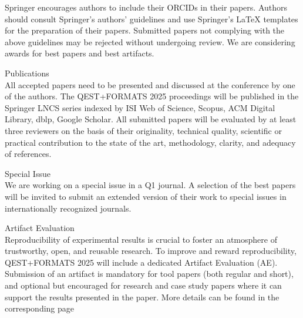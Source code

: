 Springer encourages authors to include their ORCIDs in their papers. Authors should consult Springer’s authors’ guidelines and use Springer’s LaTeX templates for the preparation of their papers. Submitted papers not complying with the above guidelines may be rejected without undergoing review.
We are considering awards for best papers and best artifacts.

Publications\\
All accepted papers need to be presented and discussed at the conference by one of the authors. The QEST+FORMATS 2025 proceedings will be published in the Springer LNCS series indexed by ISI Web of Science, Scopus, ACM Digital Library, dblp, Google Scholar. All submitted papers will be evaluated by at least three reviewers on the basis of their originality, technical quality, scientific or practical contribution to the state of the art, methodology, clarity, and adequacy of references.

Special Issue\\
We are working on a special issue in a Q1 journal. A selection of the best papers will be invited to submit an extended version of their work to special issues in internationally recognized journals.

Artifact Evaluation\\
Reproducibility of experimental results is crucial to foster an atmosphere of trustworthy, open, and reusable research. To improve and reward reproducibility, QEST+FORMATS 2025 will include a dedicated Artifact Evaluation (AE). Submission of an artifact is mandatory for tool papers (both regular and short), and optional but encouraged for research and case study papers where it can support the results presented in the paper. More details can be found in the corresponding page

